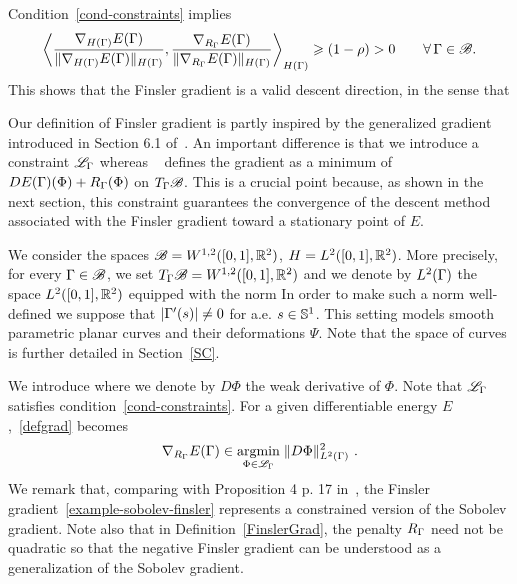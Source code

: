 Condition~\eqref{cond-constraints} implies
\begin{equation}\label{strictdirection}
	\left\langle \frac{\nabla_{H(\Gamma)}E (\Gamma)}{\|\nabla_{H(\Gamma)}E (\Gamma)\|_{H(\Gamma)}} , \frac{\nabla_{R_\Gamma}E (\Gamma) }{\|\nabla_{R_\Gamma}E (\Gamma) \|_{H(\Gamma)}}\right\rangle_{H(\Gamma)} \geqslant (1-\rho)>0 \quad\quad \forall \, \Gamma\in \mathcal{B}.
 \end{equation}
This shows that the Finsler gradient is a valid descent direction, in the sense that

\begin{rem}
Our definition of Finsler gradient is partly inspired by the generalized gradient introduced  in Section 6.1 of~\cite{charpiat-generalized-gradient}. An important difference is that we introduce a constraint $\mathcal{L}_\Gamma$ whereas ~\cite{charpiat-generalized-gradient} defines the gradient as a minimum of $DE(\Gamma)(\Phi)+R_\Gamma(\Phi)$ on $T_\Gamma\mathcal{B}$. This is a crucial point because, as shown in the next section, this constraint guarantees the convergence of the descent method associated with the Finsler gradient toward a stationary point of $E$.  
\end{rem}

\begin{rem}\label{rem-fins-sob} We consider the spaces $\mathcal{B}=W^{1,2}([0,1],\mathbb{R}^2)$, $H=L^2([0,1],\mathbb{R}^2)$. More precisely, for every $\Gamma\in\mathcal{B}$, we set $T_\Gamma \mathcal{B}= W^{1,2}([0,1],\mathbb{R}^2)$ and we denote by  $L^2(\Gamma)$ the space $L^2([0,1],\mathbb{R}^2)$ equipped with the norm 
 In order to make such a norm well-defined we suppose that  $|\Gamma'(s)|\neq 0$  for a.e. $s\in \mathbb{S}^1$.
This setting models smooth parametric planar curves and their deformations $\Psi$. Note that the space of curves is further detailed in Section~\ref{SC}. 

We introduce 
where we denote by $D\Phi$ the weak derivative of $\Phi$. Note that $\mathcal{L}_\Gamma$ satisfies condition~\eqref{cond-constraints}.
For a given differentiable energy $E$,~\eqref{defgrad} becomes
\begin{equation}	\label{example-sobolev-finsler}	
	\nabla_{R_\Gamma} E(\Gamma) \in \underset{ \Phi \in \mathcal{L}_\Gamma }{\operatorname{argmin}}\; \|  D\Phi  \|_{L^2(\Gamma)}^2~.
\end{equation}
We remark that, comparing with Proposition 4 p. 17 in~\cite{charpiat-generalized-gradient}, the Finsler gradient~\eqref{example-sobolev-finsler}  represents a constrained version of the Sobolev gradient. Note also that in  Definition~\ref{FinslerGrad}, the penalty $R_\Gamma$ need not  be quadratic so that the negative Finsler gradient can be understood as a generalization of the Sobolev gradient.
\end{rem}



